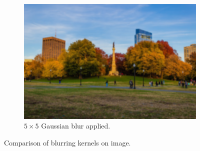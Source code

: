 \documentclass{article}
\begin{document}
\begin{example}
\begin{figure}[H]
\begin{subfigure}[b]{0.32\textwidth}
            \includegraphics[width=\textwidth]{img/OpenCV/Gaussian_Blur.png}
            \caption{$5 \times 5$ Gaussian blur applied. }
            \label{fig:Gaussian_Blur}
        \end{subfigure}

        \caption{Comparison of blurring kernels on image. }
        \label{fig:blur}
      \end{figure}
    \end{example}
\end{document}
